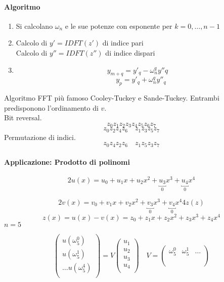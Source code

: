 \paragraph{Algoritmo}
\begin{enumerate}
\item Si calcolano $\omega_n$ e le sue potenze con esponente
      per $k=0, \ldots, n-1$
\item Calcolo di $y'= IDFT(z')$ di indice pari\\
      Calcolo di $y''= IDFT(z'')$ di indice dispari

\item
$$ y_{m+q} = y'_q - \omega_n^{q}y''q$$
$$\quad y_p = y'_q  + \omega_n^{q} y''_q$$
\end{enumerate}
Algoritmo FFT pi\`u famoso Cooley-Tuckey e Sande-Tuckey.
Entrambi predisponono l'ordinamento di $v$. \\

Bit reversal.
$$z_0z_1z_2 z_3 z_4 z_5 z_6 z_7$$
$$z_0 z_2 z_4 z_6 \quad z_1 z_3 z_5 z_7 $$
Permutazione di indici.
$$z_0 z_4 z_2 z_6 \quad z_1 z_5  z_3 z_7 $$

\paragraph{Applicazione: Prodotto di polinomi}
%
$$
2 u(x) = u_0 + u_1x + u_2 x^2  + \underbracket{u_3}_{0} x^{3} + \underbracket{u_4}_{0} x^{4}$$

$$2 v(x) =  v_0 + v_1x + v_2 x^2  + \underbracket{v_3}_{0} x^{3} + \underbracket{v_4}_{0} x^{4}
4 z(z)
$$
$$
z(x) = u(x) -v(x) = z_0  + z_1x + z_2 x^{2} + z_3 x^{3} + z_4 x^{4}
$$
$n=5$

$$
\begin{pmatrix}
  u(\omega_5^{0}) \\
  u(\omega_5^{1}) \\
 \ldots
  u(\omega_5^{4}) \\
\end{pmatrix}
=
V
\begin{pmatrix}
  u_1 \\
  u_2 \\
 u_3 \\
 u_4 \\
\end{pmatrix}
\quad
V=
\begin{pmatrix}
 \omega_5^{0} & \omega_5^{1} & \ldots \\
\\
\\
\end{pmatrix}
$$

